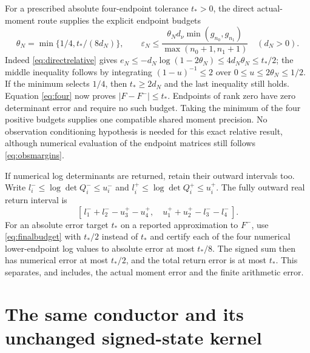 \documentclass[11pt]{article}
\begin{document}
For a prescribed absolute four-endpoint tolerance $t_*>0$, the
direct actual-moment route supplies the explicit endpoint budgets
\begin{equation}\label{eq:finalbudget}
 \boxed{\theta_N=\min\{1/4,t_*/(8d_N)\},\qquad
 \varepsilon_N\le
 \frac{\theta_Nd_\nu\min(g_{n_0},g_{n_1})}
      {\max(n_0+1,n_1+1)}\quad(d_N>0).}
\end{equation}
Indeed \eqref{eq:directrelative} gives
$e_N\le-d_N\log(1-2\theta_N)\le4d_N\theta_N\le t_*/2$;
the middle inequality follows by integrating
$(1-u)^{-1}\le2$ over $0\le u\le2\theta_N\le1/2$.
If the minimum selects $1/4$, then $t_*\ge2d_N$ and the last
inequality still holds. Equation \eqref{eq:four} now proves
$|F-F^-|\le t_*$. Endpoints of rank zero have zero determinant
error and require no such budget. Taking the minimum of the four
positive budgets supplies one compatible shared moment precision.
No observation conditioning hypothesis is needed for this exact
relative result, although numerical evaluation of the endpoint
matrices still follows \eqref{eq:obsmargins}.

If numerical log determinants are returned, retain their outward
intervals too. Write $l_i^-\le\log\det Q_i^-\le u_i^-$ and
$l_i^+\le\log\det Q_i^+\le u_i^+$. The fully outward real
return interval is
\[
 [\,l_1^-+l_2^--u_3^+-u_4^+,\quad
       u_1^++u_2^+-l_3^--l_4^-\,].
\]
For an absolute error target $t_*$ on a reported approximation
to $F^-$, use \eqref{eq:finalbudget} with $t_*/2$ instead of
$t_*$ and certify each of the four numerical lower-endpoint log
values to absolute error at most $t_*/8$. The signed sum then
has numerical error at most $t_*/2$, and the total return error
is at most $t_*$. This separates, and includes, the actual moment
error and the finite arithmetic error.

\section{The same conductor and its unchanged signed-state kernel}
\end{document}
